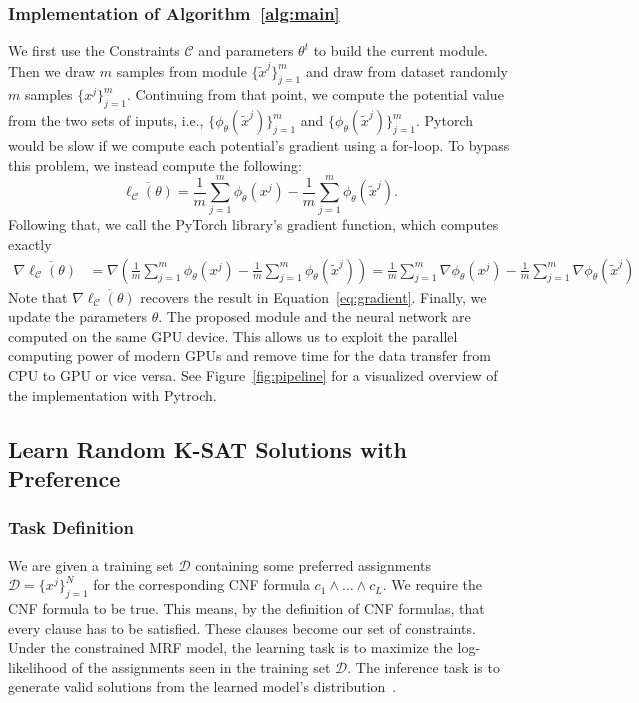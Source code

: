 \subsubsection{Implementation of  Algorithm~\ref{alg:main}}  We first use the Constraints $\mathcal{C}$ and parameters $\theta^t$ to build the current \nls module.  Then we draw $m$ samples from \nls module $\{\tilde{x}^j\}_{j=1}^m$ and draw from dataset randomly $m$ samples $\{x^j\}_{j=1}^m$. Continuing from that point, we compute the potential value from the two sets of inputs, i.e., $\{ \phi_{\theta}(\tilde{x}^j)\}_{j=1}^m$ and $\{ \phi_{\theta}(\tilde{x}^j)\}_{j=1}^m$. Pytorch would be slow if we compute each potential's gradient using a for-loop. To bypass this problem, we instead compute the following:
\begin{equation} \label{eq:emp-gradient}
\overline{\ell_{\mathcal{C}}(\theta)}= \frac{1}{m}\sum_{j=1}^m \phi_{\theta}(x^j)-\frac{1}{m}\sum_{j=1}^m \phi_{\theta}(\tilde{x}^j).
\end{equation}
Following that, we call the PyTorch library's gradient function, which computes exactly
\begin{equation*}
\begin{aligned}
\nabla\overline{\ell_{\mathcal{C}}(\theta)}&=\nabla\left(\frac{1}{m}\sum_{j=1}^m \phi_{\theta}(x^j)-\frac{1}{m}\sum_{j=1}^m \phi_{\theta}(\tilde{x}^j)\right)=\frac{1}{m}\sum_{j=1}^m \nabla\phi_{\theta}(x^j)-\frac{1}{m}\sum_{j=1}^m \nabla\phi_{\theta}(\tilde{x}^j)
\end{aligned}
\end{equation*}
Note that $\nabla\overline{\ell_{\mathcal{C}}(\theta)}$ recovers the result in Equation~\eqref{eq:gradient}. Finally, we update the parameters $\theta$. The proposed \nls module and the neural network are computed on the same GPU device. This allows us to exploit the parallel computing power of modern GPUs and remove time for the data transfer from CPU to GPU or vice versa.   See Figure~\ref{fig:pipeline} for a visualized overview of the implementation with Pytroch.




\subsection{Learn Random K-SAT Solutions with Preference}
\subsubsection{Task Definition}  We are given a training set $\mathcal{D}$ containing some preferred assignments $\mathcal{D}=\{x^j\}_{j=1}^N$ for the corresponding CNF formula $c_1\wedge\ldots\wedge  c_L$. We require the CNF formula to be true. This means, by the definition of CNF formulas, that every clause has to be satisfied. These clauses become our set of constraints. Under the constrained MRF model, the learning task is to maximize the log-likelihood of the assignments seen in the training set $\mathcal{D}$. The inference task is to generate valid solutions from  the learned model's distribution~\cite{DBLP:conf/aiia/DodaroP19,DBLP:conf/sac/RosaGO11}.


